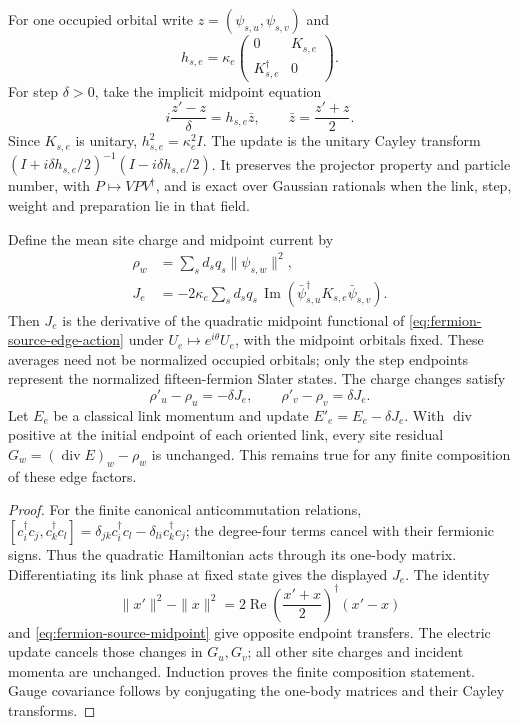 For one occupied orbital write $z=(\psi_{s,u},\psi_{s,v})$ and
\[
 h_{s,e}=\kappa_e
 \begin{pmatrix}0&K_{s,e}\\K_{s,e}^\dagger&0\end{pmatrix}.
\]
For step $\delta>0$, take the implicit midpoint equation
\begin{equation}
 i\frac{z'-z}{\delta}=h_{s,e}\bar z,
 \qquad \bar z=\frac{z'+z}{2}.
 \label{eq:fermion-source-midpoint}
\end{equation}
Since $K_{s,e}$ is unitary, $h_{s,e}^2=\kappa_e^2 I$.
The update is the unitary Cayley transform
$(I+i\delta h_{s,e}/2)^{-1}(I-i\delta h_{s,e}/2)$.
It preserves the projector property and particle number, with
$P\mapsto VPV^\dagger$, and is exact over Gaussian rationals
when the link, step, weight and preparation lie in that field.

\begin{proposition}
\label{prop:fermion-source-current}
Define the mean site charge and midpoint current by
\begin{align}
 \rho_w&=\sum_s d_s q_s\|\psi_{s,w}\|^2,\\
 J_e&=-2\kappa_e\sum_s d_sq_s\,
       \operatorname{Im}(\bar\psi_{s,u}^\dagger
                         K_{s,e}\bar\psi_{s,v}).
 \label{eq:fermion-source-current}
\end{align}
Then $J_e$ is the derivative of the quadratic midpoint functional of
\eqref{eq:fermion-source-edge-action} under $U_e\mapsto e^{i\theta}U_e$,
with the midpoint orbitals fixed. These averages need not be normalized
occupied orbitals; only the step endpoints represent the normalized
fifteen-fermion Slater states. The charge changes satisfy
\[
 \rho'_u-\rho_u=-\delta J_e,\qquad
 \rho'_v-\rho_v=\delta J_e.
\]
Let $E_e$ be a classical link momentum and update
$E'_e=E_e-\delta J_e$. With $\operatorname{div}$ positive at the initial
endpoint of each oriented link, every site residual
$G_w=(\operatorname{div}E)_w-\rho_w$ is unchanged. This remains true for
any finite composition of these edge factors.
\end{proposition}
\begin{proof}
For the finite canonical anticommutation relations,
$[c_i^\dagger c_j,c_k^\dagger c_l]
=\delta_{jk}c_i^\dagger c_l-\delta_{li}c_k^\dagger c_j$;
the degree-four terms cancel with their fermionic signs. Thus the quadratic
Hamiltonian acts through its one-body matrix. Differentiating its link
phase at fixed state gives the displayed $J_e$.
The identity
\[
 \|x'\|^2-\|x\|^2
 =2\operatorname{Re}\left(\frac{x'+x}{2}\right)^\dagger(x'-x)
\]
and \eqref{eq:fermion-source-midpoint} give opposite endpoint transfers.
The electric update cancels those changes in $G_u,G_v$; all other site
charges and incident momenta are unchanged. Induction proves the finite
composition statement. Gauge covariance follows by conjugating the
one-body matrices and their Cayley transforms.
\end{proof}

